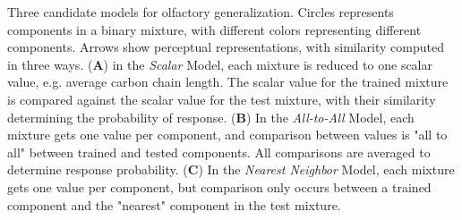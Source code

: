 \label{fig:cartoon}
Three candidate models for olfactory generalization.  Circles represents components in a binary mixture, with different colors representing different components.  Arrows show perceptual representations, with similarity computed in three ways. (\textbf{A}) in the \textit{Scalar} Model, each mixture is reduced to one scalar value, e.g. average carbon chain length.  The scalar value for the trained mixture is compared against the scalar value for the test mixture, with their similarity determining the probability of response. (\textbf{B}) In the \textit{All-to-All} Model, each mixture gets one value per component, and comparison between values is "all to all" between trained and tested components.  All comparisons are averaged to determine response probability. (\textbf{C}) In the \textit{Nearest Neighbor} Model, each mixture gets one value per component, but comparison only occurs between a trained component and the "nearest" component in the test mixture.  